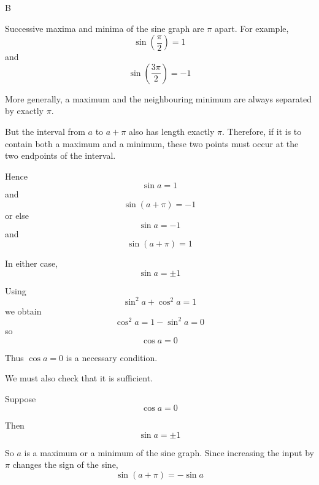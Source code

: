 \documentclass[11pt,a4paper]{article}
\begin{document}
\begin{enumerate}[label=\textbf{\arabic*.},leftmargin=*,itemsep=0pt,start=17]
\begin{djsSolution}{B}
\begin{djsSolutionFigure}
\end{djsSolutionFigure}

Successive maxima and minima of the sine graph are \(\pi\) apart. For example,
\[
\sin\left(\frac{\pi}{2}\right)=1
\]
and
\[
\sin\left(\frac{3\pi}{2}\right)=-1
\]

More generally, a maximum and the neighbouring minimum are always separated by exactly \(\pi\).

But the interval from \(a\) to \(a+\pi\) also has length exactly \(\pi\). Therefore, if it is to contain both a maximum and a minimum, these two points must occur at the two endpoints of the interval.

Hence
\[
\sin a=1
\]
and
\[
\sin(a+\pi)=-1
\]
or else
\[
\sin a=-1
\]
and
\[
\sin(a+\pi)=1
\]

In either case,
\[
\sin a=\pm1
\]

Using
\[
\sin^2a+\cos^2a=1
\]
we obtain
\[
\cos^2a=1-\sin^2a=0
\]
so
\[
\cos a=0
\]

Thus \(\cos a=0\) is a necessary condition.

We must also check that it is sufficient.

Suppose
\[
\cos a=0
\]

Then
\[
\sin a=\pm1
\]

So \(a\) is a maximum or a minimum of the sine graph. Since increasing the input by \(\pi\) changes the sign of the sine,
\[
\sin(a+\pi)=-\sin a
\]


\end{djsSolution}
\end{enumerate}
\end{document}

